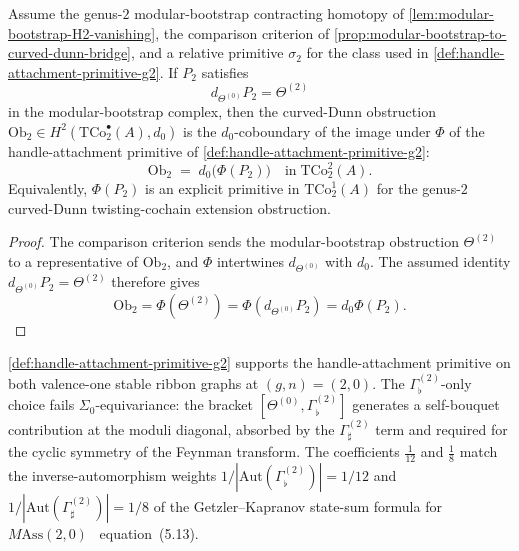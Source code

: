 \begin{theorem}[Conditional chain-level coboundary witness at \(g = 2\)]
\label{thm:curved-dunn-H2-explicit-coboundary-g-geq-2}
Assume the genus-\(2\) modular-bootstrap contracting homotopy of
\autoref{lem:modular-bootstrap-H2-vanishing}, the comparison
criterion of
\autoref{prop:modular-bootstrap-to-curved-dunn-bridge}, and a
relative primitive \(\sigma_{2}\) for the class used in
\autoref{def:handle-attachment-primitive-g2}. If \(P_{2}\) satisfies
\[
d_{\Theta^{(0)}}P_{2}=\Theta^{(2)}
\]
in the modular-bootstrap complex, then the curved-Dunn obstruction
\(\mathrm{Ob}_{2} \in H^{2}(\mathrm{TCo}^{\bullet}_{2}(A), d_{0})\)
is the \(d_{0}\)-coboundary of the image under \(\Phi\) of the
handle-attachment primitive of
\autoref{def:handle-attachment-primitive-g2}:
\[
 \mathrm{Ob}_{2}
 \;=\;
 d_{0}\bigl(\Phi(P_{2})\bigr)
 \quad\text{in}\;
 \mathrm{TCo}^{2}_{2}(A).
\]
Equivalently, \(\Phi(P_{2})\) is an explicit primitive in
\(\mathrm{TCo}^{1}_{2}(A)\) for the genus-\(2\) curved-Dunn
twisting-cochain extension obstruction.
\end{theorem}

\begin{proof}
The comparison criterion sends the modular-bootstrap obstruction
\(\Theta^{(2)}\) to a representative of \(\mathrm{Ob}_{2}\), and
\(\Phi\) intertwines \(d_{\Theta^{(0)}}\) with \(d_{0}\). The assumed
identity \(d_{\Theta^{(0)}}P_{2}=\Theta^{(2)}\) therefore gives
\[
\mathrm{Ob}_{2}
=\Phi(\Theta^{(2)})
=\Phi(d_{\Theta^{(0)}}P_{2})
=d_{0}\Phi(P_{2}).
\]
\end{proof}

\begin{remark}
\label{rem:witness-uses-both-graphs}
\autoref{def:handle-attachment-primitive-g2} supports the
handle-attachment primitive on both valence-one stable ribbon
graphs at \((g, n) = (2, 0)\). The \(\Gamma^{(2)}_{\flat}\)-only
choice fails \(\Sigma_{0}\)-equivariance: the bracket
\([\Theta^{(0)}, \Gamma^{(2)}_{\flat}]\) generates a self-bouquet
contribution at the moduli diagonal, absorbed by the
\(\Gamma^{(2)}_{\sharp}\) term and required for the cyclic
symmetry of the Feynman transform. The coefficients
\(\tfrac{1}{12}\) and \(\tfrac{1}{8}\) match the
inverse-automorphism weights
\(1/|\mathrm{Aut}(\Gamma^{(2)}_{\flat})| = 1/12\) and
\(1/|\mathrm{Aut}(\Gamma^{(2)}_{\sharp})| = 1/8\) of the
Getzler--Kapranov state-sum formula for \(M\mathrm{Ass}(2, 0)\)
\cite{GeK98}~equation~(5.13).
\end{remark}


